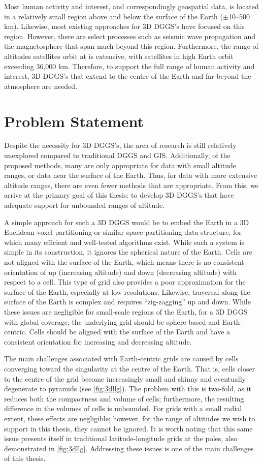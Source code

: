 Most human activity and interest, and correspondingly geospatial data, is located in a relatively small region above and below the surface of the Earth ($\pm$10--500 km).
Likewise, most existing approaches for 3D DGGS's have focused on this region.
However, there are select processes such as seismic wave propagation and the magnetosphere that span much beyond this region.
Furthermore, the range of altitudes satellites orbit at is extensive, with satellites in high Earth orbit exceeding 36,000 km.
Therefore, to support the full range of human activity and interest, 3D DGGS's that extend to the centre of the Earth and far beyond the atmosphere are needed.


\section{Problem Statement} \label{chap:1:problem}
Despite the necessity for 3D DGGS's, the area of research is still relatively unexplored compared to traditional DGGS and GIS.
Additionally, of the proposed methods, many are only appropriate for data with small altitude ranges, or data near the surface of the Earth.
Thus, for data with more extensive altitude ranges, there are even fewer methods that are appropriate. 
From this, we arrive at the primary goal of this thesis: to develop 3D DGGS's that have adequate support for unbounded ranges of altitude. 


A simple approach for such a 3D DGGS would be to embed the Earth in a 3D Euclidean voxel partitioning or similar space partitioning data structure, for which many efficient and well-tested algorithms exist.
While such a system is simple in its construction, it ignores the spherical nature of the Earth.
Cells are not aligned with the surface of the Earth, which means there is no consistent orientation of up (increasing altitude) and down (decreasing altitude) with respect to a cell.
This type of grid also provides a poor approximation for the surface of the Earth, especially at low resolutions.
Likewise, traversal along the surface of the Earth is complex and requires ``zig-zagging'' up and down.
While these issues are negligible for small-scale regions of the Earth, for a 3D DGGS with global coverage, the underlying grid should be sphere-based and Earth-centric.
Cells should be aligned with the surface of the Earth and have a consistent orientation for increasing and decreasing altitude.


The main challenges associated with Earth-centric grids are caused by cells converging toward the singularity at the centre of the Earth.
That is, cells closer to the centre of the grid become increasingly small and skinny and eventually degenerate to pyramids
(see \cref{fig:3dllg}).
The problem with this is two-fold, as it reduces both the compactness and volume of cells; furthermore, the resulting difference in the volumes of cells is unbounded.
For grids with a small radial extent, these effects are negligible; however, for the range of altitudes we wish to support in this thesis, they cannot be ignored.
It is worth noting that this same issue presents itself in traditional latitude-longitude grids at the poles, also demonstrated in \cref{fig:3dllg}.
Addressing these issues is one of the main challenges of this thesis.


